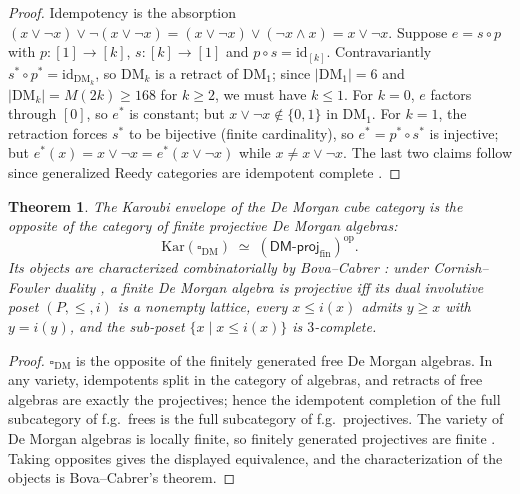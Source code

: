 \documentclass[11pt]{amsart}
\newtheorem{thm}{Theorem}[section]
\theoremstyle{definition}
\newcommand{\DM}{\mathrm{DM}}
\newcommand{\cube}{\square_{\mathrm{DM}}}
\newcommand{\Kar}{\mathrm{Kar}}
\begin{document}
\begin{proof}
  Idempotency is the absorption
  $(x \vee \neg x) \vee \neg(x \vee \neg x)
  = (x \vee \neg x) \vee (\neg x \wedge x) = x \vee \neg x$.
  Suppose $e = s \circ p$ with $p : [1] \to [k]$, $s : [k] \to [1]$
  and $p \circ s = \mathrm{id}_{[k]}$.  Contravariantly
  $s^{*} \circ p^{*} = \mathrm{id}_{\DM_k}$, so $\DM_k$ is a retract
  of $\DM_1$; since $|\DM_1| = 6$ and $|\DM_k| = M(2k) \geq 168$ for
  $k \geq 2$, we must have $k \leq 1$.  For $k = 0$, $e$ factors
  through $[0]$, so $e^{*}$ is constant; but
  $x \vee \neg x \notin \{0, 1\}$ in $\DM_1$.  For $k = 1$, the
  retraction forces $s^{*}$ to be bijective (finite cardinality), so
  $e^{*} = p^{*} \circ s^{*}$ is injective; but
  $e^{*}(x) = x \vee \neg x = e^{*}(x \vee \neg x)$ while
  $x \neq x \vee \neg x$.  The last two claims follow since
  generalized Reedy categories are idempotent complete
  \cite{Campion}.
\end{proof}

\begin{thm}
  \label{thm:karoubi}
  The Karoubi envelope of the De Morgan cube category is the
  opposite of the category of finite projective De Morgan algebras:
  \[
    \Kar(\cube) \;\simeq\;
    (\mathsf{DM}\text{-}\mathsf{proj}_{\mathrm{fin}})^{\mathrm{op}}.
  \]
  Its objects are characterized combinatorially by Bova--Cabrer
  \cite[Thm.~11]{BovaCabrer}: under Cornish--Fowler duality
  \cite{CornishFowler}, a finite De Morgan algebra is projective iff
  its dual involutive poset $(P, \leq, i)$ is a nonempty lattice, every
  $x \leq i(x)$ admits $y \geq x$ with $y = i(y)$, and the sub-poset
  $\{x \mid x \leq i(x)\}$ is $3$-complete.
\end{thm}

\begin{proof}
  $\cube$ is the opposite of the finitely generated free De Morgan
  algebras.  In any variety, idempotents split in the category of
  algebras, and retracts of free algebras are exactly the
  projectives; hence the idempotent completion of the full
  subcategory of f.g.\ frees is the full subcategory of
  f.g.\ projectives.  The variety of De Morgan algebras is locally
  finite, so finitely generated projectives are finite
  \cite{BovaCabrer}.  Taking opposites gives the displayed
  equivalence, and the characterization of the objects is
  Bova--Cabrer's theorem.
\end{proof}
\end{document}

